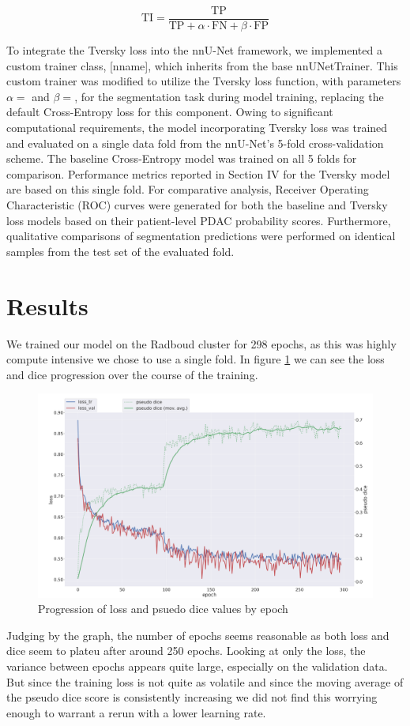 \documentclass[conference]{IEEEtran}
\begin{document}
\[
\text{TI} = \frac{\text{TP}}{\text{TP} + \alpha \cdot \text{FN} + \beta \cdot \text{FP}}
\]

To integrate the Tversky loss into the nnU-Net framework, we implemented a custom trainer class, [nname], which inherits from the base nnUNetTrainer. This custom trainer was modified to utilize the Tversky loss function, with parameters $\alpha=$ and $\beta=$, for the segmentation task during model training, replacing the default Cross-Entropy loss for this component. Owing to significant computational requirements, the model incorporating Tversky loss was trained and evaluated on a single data fold from the nnU-Net's 5-fold cross-validation scheme. The baseline Cross-Entropy model was trained on all 5 folds for comparison. Performance metrics reported in Section IV for the Tversky model are based on this single fold. For comparative analysis, Receiver Operating Characteristic (ROC) curves were generated for both the baseline and Tversky loss models based on their patient-level PDAC probability scores. Furthermore, qualitative comparisons of segmentation predictions were performed on identical samples from the test set of the evaluated fold.
\section{Results}
We trained our model on the Radboud cluster for 298 epochs, as this was highly compute intensive we chose to use a single fold. In figure \ref{fig:progress} we can see the loss and dice progression over the course of the training. 

\begin{figure}[htbp]
  \centering
  \includegraphics[width=0.75\linewidth]{./figures/progress[1].png}
  \caption{Progression of loss and psuedo dice values by epoch}
  \label{fig:progress}
\end{figure}

Judging by the graph, the number of epochs seems reasonable as both loss and dice seem to plateu after around 250 epochs. Looking at only the loss, the variance between epochs appears quite large, especially on the validation data. But since the training loss is not quite as volatile and since the moving average of the pseudo dice score is consistently increasing we did not find this worrying enough to warrant a rerun with a lower learning rate.
\end{document}
